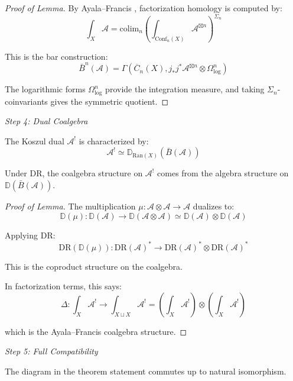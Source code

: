 \begin{proof}[Proof of Lemma]
By Ayala--Francis \cite[Theorem 4.19]{AF15}, factorization homology is computed by:
\[\int_X \mathcal{A} = \text{colim}_n \left(\int_{\text{Conf}_n(X)} 
\mathcal{A}^{\boxtimes n}\right)^{\Sigma_n}\]

This is the bar construction:
\[\bar{B}^n(\mathcal{A}) = \Gamma(\overline{C}_n(X), j_* j^* \mathcal{A}^{\boxtimes n} 
\otimes \Omega^n_{\log})\]

The logarithmic forms $\Omega^n_{\log}$ provide the integration measure, and taking 
$\Sigma_n$-coinvariants gives the symmetric quotient.
\end{proof}

\emph{Step 4: Dual Coalgebra}

The Koszul dual $\mathcal{A}^!$ is characterized by:
\[\mathcal{A}^! \simeq \mathbb{D}_{\text{Ran}(X)}(\bar{B}(\mathcal{A}))\]

\begin{lemma}\label{lem:coalgebra-verdier-AF}
Under $\text{DR}$, the coalgebra structure on $\mathcal{A}^!$ comes from the algebra 
structure on $\mathbb{D}(\bar{B}(\mathcal{A}))$.
\end{lemma}

\begin{proof}[Proof of Lemma]
The multiplication $\mu: \mathcal{A} \otimes \mathcal{A} \to \mathcal{A}$ dualizes to:
\[\mathbb{D}(\mu): \mathbb{D}(\mathcal{A}) \to \mathbb{D}(\mathcal{A} \otimes \mathcal{A}) 
\simeq \mathbb{D}(\mathcal{A}) \otimes \mathbb{D}(\mathcal{A})\]

Applying $\text{DR}$:
\[\text{DR}(\mathbb{D}(\mu)): \text{DR}(\mathcal{A})^* \to \text{DR}(\mathcal{A})^* 
\otimes \text{DR}(\mathcal{A})^*\]

This is the coproduct structure on the coalgebra.

In factorization terms, this says:
\[\Delta: \int_X \mathcal{A}^! \to \int_{X \sqcup X} \mathcal{A}^! 
= \left(\int_X \mathcal{A}^!\right) \otimes \left(\int_X \mathcal{A}^!\right)\]

which is the Ayala--Francis coalgebra structure.
\end{proof}

\emph{Step 5: Full Compatibility}

\begin{lemma}\label{lem:diagram-commutes-AF}
The diagram in the theorem statement commutes up to natural isomorphism.
\end{lemma}

